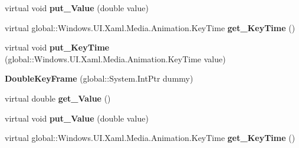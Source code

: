 \begin{DoxyCompactItemize}
virtual void {\bfseries put\+\_\+\+Value} (double value)
\item 
\mbox{\label{class_windows_1_1_u_i_1_1_xaml_1_1_media_1_1_animation_1_1_double_key_frame_aaa90bbff5cfbe24151ea9aa41a84bdc3}} 
virtual global\+::\+Windows.\+U\+I.\+Xaml.\+Media.\+Animation.\+Key\+Time {\bfseries get\+\_\+\+Key\+Time} ()
\item 
\mbox{\label{class_windows_1_1_u_i_1_1_xaml_1_1_media_1_1_animation_1_1_double_key_frame_a24618f65820c8ef09899ef7a3e13156f}} 
virtual void {\bfseries put\+\_\+\+Key\+Time} (global\+::\+Windows.\+U\+I.\+Xaml.\+Media.\+Animation.\+Key\+Time value)
\item 
\mbox{\label{class_windows_1_1_u_i_1_1_xaml_1_1_media_1_1_animation_1_1_double_key_frame_a901b2c0f622bb7b0e3f8f1c92ef2e678}} 
{\bfseries Double\+Key\+Frame} (global\+::\+System.\+Int\+Ptr dummy)
\item 
\mbox{\label{class_windows_1_1_u_i_1_1_xaml_1_1_media_1_1_animation_1_1_double_key_frame_adc110c3fd704a81e10de729dc7620cbe}} 
virtual double {\bfseries get\+\_\+\+Value} ()
\item 
\mbox{\label{class_windows_1_1_u_i_1_1_xaml_1_1_media_1_1_animation_1_1_double_key_frame_ac8e9c608ef950cb4d594ab20df238c67}} 
virtual void {\bfseries put\+\_\+\+Value} (double value)
\item 
\mbox{\label{class_windows_1_1_u_i_1_1_xaml_1_1_media_1_1_animation_1_1_double_key_frame_aaa90bbff5cfbe24151ea9aa41a84bdc3}} 
virtual global\+::\+Windows.\+U\+I.\+Xaml.\+Media.\+Animation.\+Key\+Time {\bfseries get\+\_\+\+Key\+Time} ()
\item 
\mbox{\label{class_windows_1_1_u_i_1_1_xaml_1_1_media_1_1_animation_1_1_double_key_frame_a24618f65820c8ef09899ef7a3e13156f}} 

\end{DoxyCompactItemize}
